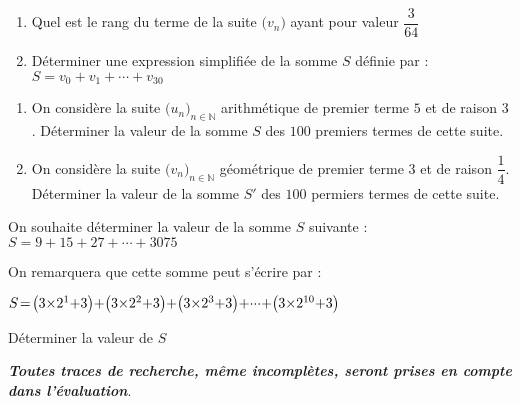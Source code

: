 \documentclass{book}
\begin{document}
\begin{multicols*}{2}
\begin{enumerate}
\begin{enumerate}
\item Quel est le rang du terme de la suite $\big(v_n\big)$ ayant pour valeur $\dfrac3{64}$

\item D\'eterminer une expression simplifi\'ee de la somme $S$ d\'efinie par :\newline
\hglue\leftmarginii$S=v_0+v_1+\cdots+v_{30}$
\end{enumerate}
\end{enumerate}



\leavevmode\exercice


\begin{enumerate}
\item On consid\`ere la suite $\big(u_n\big)_{n\in\mathbb{N}}$ arithm\'etique de premier terme $5$ et de raison $3$.\newline
D\'eterminer la valeur de la somme $S$ des $100$ premiers termes de cette suite.

\item On consid\`ere la suite $\big(v_n\big)_{n\in\mathbb{N}}$ g\'eom\'etrique de premier terme $3$ et de raison $\dfrac14$.\newline
D\'eterminer la valeur de la somme $S'$ des $100$ permiers termes de cette suite.
\end{enumerate}

\leavevmode\exercice


On souhaite d\'eterminer la valeur de la somme $S$ suivante :\newline
\hglue\leftmargini$S=9+15+27+\cdots+3075$

On remarquera que cette somme peut s'\'ecrire par :

\hglue\leftmargini$\Se S=\big(3\times2^1{+}3\big)
+\big(3\times2^2{+}3\big)
+\big(3\times2^3{+}3\big)
+\cdots+
\big(3\times2^{10}{+}3\big)$

D\'eterminer la valeur de $S$

{\sl\bfseries Toutes traces de recherche, m\^eme incompl\`etes, seront prises en compte dans l'\'evaluation}.

\end{multicols*}
\end{document}
